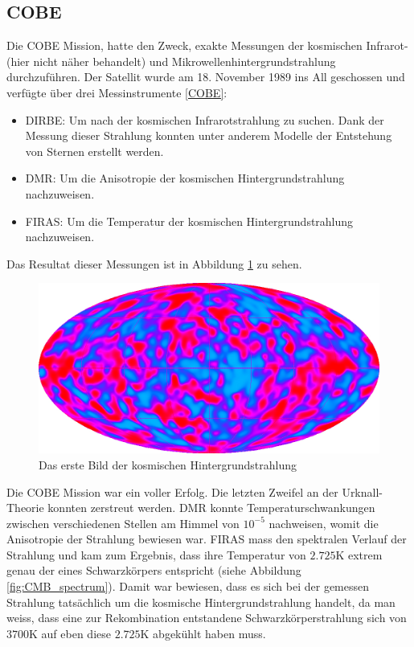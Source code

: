 \subsection{\ac{COBE}}
Die \ac{COBE} Mission, hatte den Zweck, exakte 
Messungen der kosmischen Infrarot-(hier nicht näher behandelt) und 
Mikrowellenhintergrundstrahlung durchzuführen.
Der Satellit wurde am 18. November 1989 ins All geschossen und verfügte über 
drei Messinstrumente \ref{COBE}:
\begin{itemize}
	\item \ac{DIRBE}: Um nach der 
	kosmischen Infrarotstrahlung zu suchen.
	Dank der Messung dieser Strahlung konnten unter anderem Modelle der 
	Entstehung von Sternen erstellt werden.
	\item \ac{DMR}: Um die Anisotropie der 
	kosmischen Hintergrundstrahlung nachzuweisen.
	\item \ac{FIRAS}: Um die Temperatur 
	der kosmischen Hintergrundstrahlung nachzuweisen. 
\end{itemize}

Das Resultat dieser Messungen ist in Abbildung \ref{fig:COBE} zu sehen.
\begin{figure}
	\includegraphics[width=\linewidth]{cmb/images/CMB_COBE.png}
	\caption{Das erste Bild der kosmischen Hintergrundstrahlung}
	\label{fig:COBE}
\end{figure}
Die \ac{COBE} Mission war ein voller Erfolg.
Die letzten Zweifel an der Urknall-Theorie konnten zerstreut werden.
\ac{DMR} konnte Temperaturschwankungen zwischen verschiedenen Stellen am Himmel 
von $10^{-5}$ nachweisen, womit die Anisotropie der Strahlung bewiesen war.
\ac{FIRAS} mass den spektralen Verlauf der Strahlung und kam zum Ergebnis, dass 
ihre Temperatur von $2.725 \text{K}$ extrem genau der eines Schwarzkörpers 
entspricht (siehe Abbildung \ref{fig:CMB_spectrum}).
Damit war bewiesen, dass es sich bei der gemessen Strahlung tatsächlich um die 
kosmische Hintergrundstrahlung handelt, da man weiss, dass eine zur 
Rekombination entstandene Schwarzkörperstrahlung sich von $3700 \text{K}$ auf 
eben diese $2.725 \text{K}$ abgekühlt haben muss.

